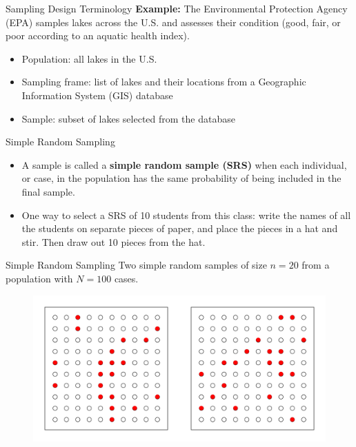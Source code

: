 \documentclass{beamer}
\begin{document}
\begin{frame}{Sampling Design Terminology}
\textbf{Example:} The Environmental Protection Agency (EPA) samples lakes across the U.S. and assesses their condition (good, fair, or poor according to an aquatic health index).
\begin{itemize}
\item Population: all lakes in the U.S.
\item Sampling frame:  list of lakes and their locations from a Geographic Information System (GIS) database
\item Sample: subset of lakes selected from the database     
\end{itemize}
\end{frame}

\begin{frame}{Simple Random Sampling}
\begin{itemize}
\item A sample is called a \textbf{simple random sample (SRS)} when each individual, or case, in the population has the same probability of being included in the final sample.   
\vspace{10pt}
\item One way to select a SRS of 10 students from this class: write the names of all the students on separate pieces of paper, and place the pieces in a hat and stir.  Then draw out 10 pieces from the hat. 
\end{itemize}
\end{frame}

\begin{frame}{Simple Random Sampling}
Two simple random samples of size $n=20$ from a population with $N=100$ cases.\\
\begin{figure}
\includegraphics[scale=0.4]{figure/srs.pdf}
\end{figure}
\end{frame}
\end{document}
